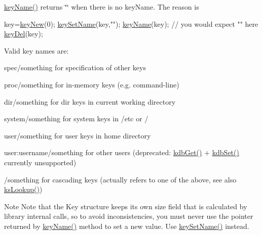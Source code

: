 \hyperlink{group__keyname_ga8e805c726a60da921d3736cda7813513}{key\-Name()} returns \char`\"{}\char`\"{} when there is no key\-Name. The reason is 
\begin{DoxyCode}
key=\hyperlink{group__key_gad23c65b44bf48d773759e1f9a4d43b89}{keyNew}(0);
\hyperlink{group__keyname_ga7699091610e7f3f43d2949514a4b35d9}{keySetName}(key,\textcolor{stringliteral}{""});
\hyperlink{group__keyname_ga8e805c726a60da921d3736cda7813513}{keyName}(key); \textcolor{comment}{// you would expect "" here}
\hyperlink{group__key_ga3df95bbc2494e3e6703ece5639be5bb1}{keyDel}(key);
\end{DoxyCode}


Valid key names are\-: 
\begin{DoxyItemize}
\item {\ttfamily spec/something} for specification of other keys
\item {\ttfamily proc/something} for in-\/memory keys (e.\-g. command-\/line)
\item {\ttfamily dir/something} for dir keys in current working directory
\item {\ttfamily system/something} for system keys in /etc or /
\item {\ttfamily user/something} for user keys in home directory
\item {\ttfamily user\-:username/something} for other users (deprecated\-: \hyperlink{group__kdb_ga28e385fd9cb7ccfe0b2f1ed2f62453a1}{kdb\-Get()} + \hyperlink{group__kdb_ga11436b058408f83d303ca5e996832bcf}{kdb\-Set()} currently unsupported)
\item {\ttfamily /something} for cascading keys (actually refers to one of the above, see also \hyperlink{group__keyset_gaa34fc43a081e6b01e4120daa6c112004}{ks\-Lookup()}) 
\end{DoxyItemize}

\begin{DoxyNote}{Note}
Note that the Key structure keeps its own size field that is calculated by library internal calls, so to avoid inconsistencies, you must never use the pointer returned by \hyperlink{group__keyname_ga8e805c726a60da921d3736cda7813513}{key\-Name()} method to set a new value. Use \hyperlink{group__keyname_ga7699091610e7f3f43d2949514a4b35d9}{key\-Set\-Name()} instead.
\end{DoxyNote}

